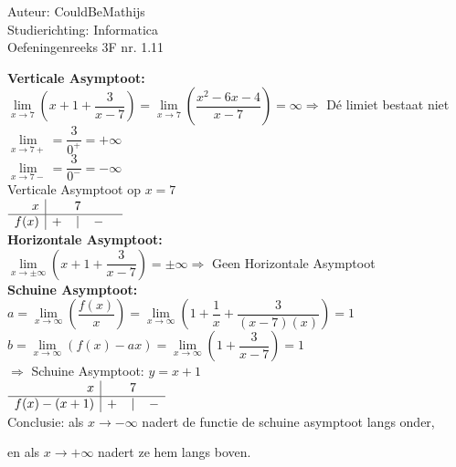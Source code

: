 \documentclass[a4paper]{article}
\newcommand{\llim}{\lim\limits}
\begin{document}
  
\noindent \large Auteur: CouldBeMathijs \\
\noindent \large Studierichting: Informatica\\
\noindent \large Oefeningenreeks 3F nr. 1.11\\

\medskip

\normalsize

\textbf{Verticale Asymptoot:}\\

$ \llim_{x \rightarrow 7} \left( x + 1 + \dfrac{3}{x-7}\right) = \llim_{x \rightarrow 7} \left( \dfrac{x^2-6x-4}{x-7} \right) = \infty \Rightarrow $ Dé limiet bestaat niet\\

$\llim_{x \rightarrow 7+} = \dfrac{3}{0^+} = +\infty$\\

$\llim_{x \rightarrow 7-} = \dfrac{3}{0^-} = -\infty$\\

Verticale Asymptoot op $x=7$\\

$\begin{array}{r|c c c c}
x & & 7 & &\\ \hline
f(x) & + & | & - &
\end{array}$ \\



\textbf{Horizontale Asymptoot:}\\

$ \llim_{x \rightarrow \pm \infty}\left( x + 1 + \dfrac{3}{x-7}\right) = \pm \infty \Rightarrow $ Geen Horizontale Asymptoot\\

\textbf{Schuine Asymptoot:}\\

$a = \llim_{x \rightarrow \infty}\left(\dfrac{f(x)}{x}\right) = \llim_{x \rightarrow \infty}\left(1+\dfrac{1}{x}+\dfrac{3}{(x-7)(x)}\right) = 1 $\\

$b = \llim_{x \rightarrow \infty}(f(x)-ax) = \llim_{x \rightarrow \infty}\left(1+\dfrac{3}{x-7}\right) = 1$\\

$\Rightarrow$ Schuine Asymptoot: $y=x+1$\\

$\begin{array}{r|c c c}
x & & 7 & \\ \hline
f(x) - (x+1) & + & | & - 
\end{array}$ \\

Conclusie: als $x \rightarrow -\infty$ nadert de functie de schuine asymptoot langs onder, 

en als $x \rightarrow +\infty$ nadert ze hem langs boven.


\begin{thebibliography}{999}
\end{thebibliography}
\end{document}

